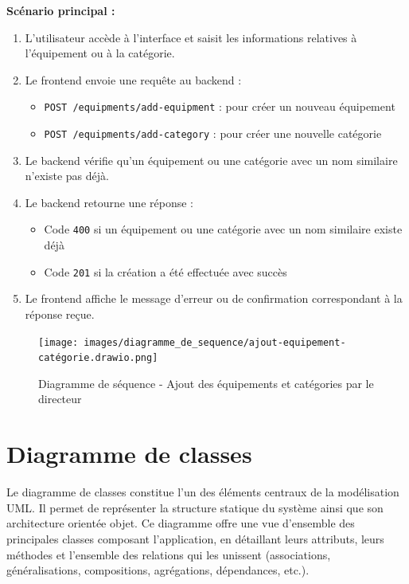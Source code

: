 \textbf{Scénario principal :} 
\begin{enumerate}
    \item L'utilisateur accède à l'interface et saisit les informations relatives à l'équipement ou à la catégorie.
    
    \item Le frontend envoie une requête au backend :
    \begin{itemize}
        \item \texttt{POST /equipments/add-equipment} : pour créer un nouveau équipement
        \item \texttt{POST /equipments/add-category} : pour créer une nouvelle catégorie
    \end{itemize}
    
    \item Le backend vérifie qu'un équipement ou une catégorie avec un nom similaire n'existe pas déjà.
    
    \item Le backend retourne une réponse :
    \begin{itemize}
        \item Code \texttt{400} si un équipement ou une catégorie avec un nom similaire existe déjà
        \item Code \texttt{201} si la création a été effectuée avec succès
    \end{itemize}
    
    \item Le frontend affiche le message d'erreur ou de confirmation correspondant à la réponse reçue.
\end{enumerate}

\begin{figure}[H]
  \centering
  \texttt{[image: images/diagramme\_de\_sequence/ajout-equipement-catégorie.drawio.png]}
  \caption{Diagramme de séquence - Ajout des équipements et catégories par le directeur}
  \label{fig:seq_ajout_equipement}
\end{figure}



\section{Diagramme de classes}

Le diagramme de classes constitue l’un des éléments centraux de la modélisation UML. Il permet de représenter la structure statique du système ainsi que son architecture orientée objet. Ce diagramme offre une vue d’ensemble des principales classes composant l’application, en détaillant leurs attributs, leurs méthodes et l’ensemble des relations qui les unissent (associations, généralisations, compositions, agrégations, dépendances, etc.).

